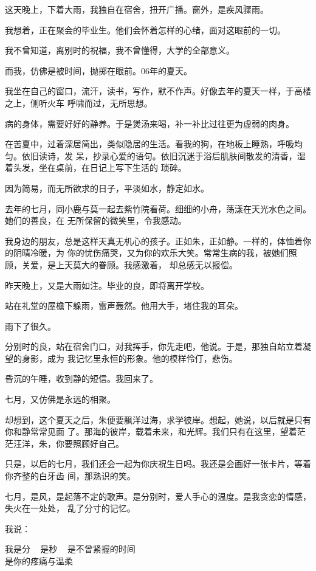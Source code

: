 		这天晚上，下着大雨，我独自在宿舍，扭开广播。窗外，是疾风骤雨。

		我想着，正在聚会的毕业生。他们会怀着怎样的心绪，面对这眼前的一切。


		我不曾知道，离别时的祝福，我不曾懂得，大学的全部意义。


		而我，仿佛是被时间，抛掷在眼前。06年的夏天。


		我坐在自己的窗口，流汗，读书，写作，默不作声。好像去年的夏天一样，于高楼之上，侧听火车
	呼啸而过，无所思想。

		病的身体，需要好好的静养。于是煲汤来喝，补一补比过往更为虚弱的肉身。

		在苦夏中，过着深居简出，类似隐居的生活。看我的狗，在地板上睡熟，呼吸均匀。依旧读诗，发
	呆，抄录心爱的语句。依旧沉迷于浴后肌肤间散发的清香，湿着头发，坐在桌前，在日记上写下生活的
	琐碎。

		因为简易，而无所欲求的日子，平淡如水，静定如水。


		去年的七月，同小鹿与莫一起去紫竹院看荷。细细的小舟，荡漾在天光水色之间。她们的善良，在
	无所保留的微笑里，令我感动。

		我身边的朋友，总是这样天真无机心的孩子。正如朱，正如静。一样的，体恤着你的阴晴冷暖，为
	你的忧伤痛哭，又为你的欢乐大笑。常常生病的我，被她们照顾，关爱，是上天莫大的眷顾。我感激着，
	却总感无以报偿。


		昨天晚上，又是大雨如注。毕业的良，即将离开学校。

		站在礼堂的屋檐下躲雨，雷声轰然。他用大手，堵住我的耳朵。

		雨下了很久。

		分别时的良，站在宿舍门口，对我挥手，你先走吧，他说。于是，那独自站立着凝望的身影，成为
	我记忆里永恒的形象。他的模样伶仃，悲伤。


		昏沉的午睡，收到静的短信。我回来了。

		七月，又仿佛是永远的相聚。

		却想到，这个夏天之后，朱便要飘洋过海，求学彼岸。想起，她说，以后就是只有你和静常常见面
	了。那海的彼岸，载着未来，和光辉。我们只有在这里，望着茫茫汪洋，朱，你要照顾好自己。

		只是，以后的七月，我们还会一起为你庆祝生日吗。我还是会画好一张卡片，等着你齐整的白牙齿
	间，那熟识的笑。


		七月，是风，是起落不定的歌声。是分别时，爱人手心的温度。是我贪恋的情感，失火在一处处，
	乱了分寸的记忆。


		我说：

		\longpoem{}{}{}
			我是分 ~ 是秒 ~ 是不曾紧握的时间 \\
			是你的疼痛与温柔

